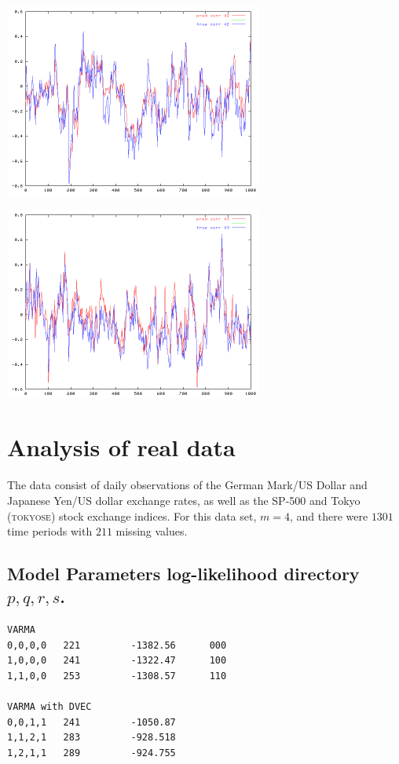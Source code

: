{\includegraphics[height=2.5in, width=\textwidth]{corrplot42.png}


\includegraphics[height=2.5in, width=\textwidth]{corrplot43.png}



\section{Analysis of real data}

The data consist of daily observations of the German Mark/US Dollar and Japanese Yen/US dollar exchange rates, as well as the SP-500 and Tokyo 
 (\textsc{tokyose}) stock exchange indices. For this data set, $m=4$, and there
were $1301$ time periods with $211$ missing values.  

\subsection{Model Parameters log-likelihood directory $p,q,r,s$.}
\begin{lstlisting}
VARMA
0,0,0,0   221         -1382.56      000
1,0,0,0   241         -1322.47      100
1,1,0,0   253         -1308.57      110

VARMA with DVEC
0,0,1,1   241         -1050.87 
1,1,2,1   283         -928.518 
1,2,1,1   289         -924.755  


\end{lstlisting}}
